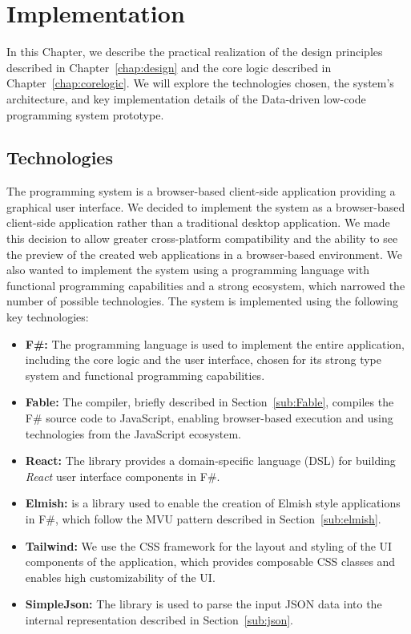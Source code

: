 \chapter{Implementation}
\label{chap:implementation}

In this Chapter, we describe the practical realization of the design principles described in Chapter~\ref{chap:design} and the core logic described in Chapter~\ref{chap:corelogic}.
We will explore the technologies chosen, the system's architecture, and key implementation details of the Data-driven low-code programming system prototype.


\section{Technologies}
\label{sec:technologies}

The programming system is a browser-based client-side application providing a graphical user interface.
We decided to implement the system as a browser-based client-side application rather than a traditional desktop application.
We made this decision to allow greater cross-platform compatibility and the ability to see the preview of the created web applications in a browser-based environment.
We also wanted to implement the system using a programming language with functional programming capabilities and a strong ecosystem, which narrowed the number of possible technologies.
The system is implemented using the following key technologies:
\begin{itemize}
	\item \textbf{F\#:} The \citet{fsharp} programming language is used to implement the entire application, including the core logic and the user interface, chosen for its strong type system and functional programming capabilities.
	\item \textbf{Fable:} The \citet{fable} compiler, briefly described in Section~\ref{sub:Fable}, compiles the F\# source code to JavaScript, enabling browser-based execution and using technologies from the JavaScript ecosystem.
	\item \textbf{React:} The \citet{feliz} library provides a domain-specific language (DSL) for building \emph{React} user interface components in F\#.
	\item \textbf{Elmish:} \citet{elmish} is a library used to enable the creation of Elmish style applications in F\#, which follow the MVU pattern described in Section~\ref{sub:elmish}.
	\item \textbf{Tailwind:} We use the \citet{tailwind} CSS framework for the layout and styling of the UI components of the application, which provides composable CSS classes and enables high customizability of the UI.
	\item \textbf{SimpleJson:} The \citet{simpleJson} library is used to parse the input JSON data into the internal representation described in Section~\ref{sub:json}.
\end{itemize}

